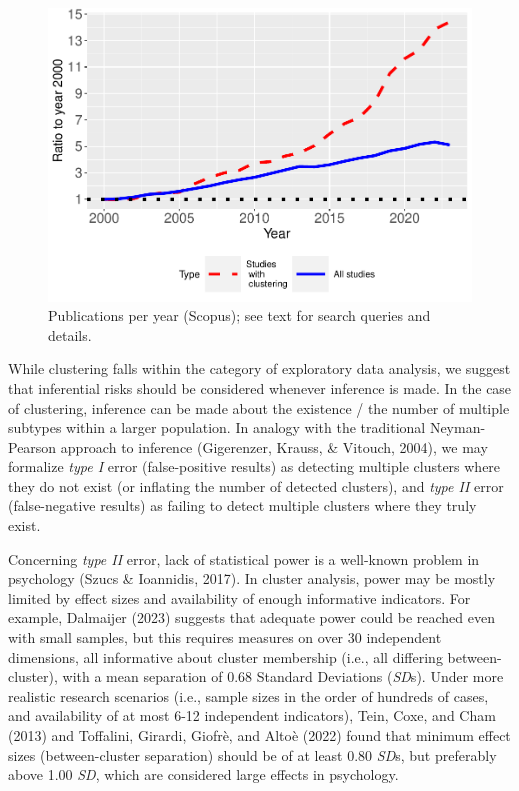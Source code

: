 \documentclass[
  man,floatsintext]{apa6}
\begin{document}
\begin{figure}

{\centering \includegraphics{paper_files/figure-latex/figure-literature-trends-1} 

}

\caption{Publications per year (Scopus); see text for search queries and details.}\label{fig:figure-literature-trends}
\end{figure}

While clustering falls within the category of exploratory data analysis, we suggest that inferential risks should be considered whenever inference is made. In the case of clustering, inference can be made about the existence / the number of multiple subtypes within a larger population. In analogy with the traditional Neyman-Pearson approach to inference (Gigerenzer, Krauss, \& Vitouch, 2004), we may formalize \emph{type I} error (false-positive results) as detecting multiple clusters where they do not exist (or inflating the number of detected clusters), and \emph{type II} error (false-negative results) as failing to detect multiple clusters where they truly exist.

Concerning \emph{type II} error, lack of statistical power is a well-known problem in psychology (Szucs \& Ioannidis, 2017). In cluster analysis, power may be mostly limited by effect sizes and availability of enough informative indicators. For example, Dalmaijer (2023) suggests that adequate power could be reached even with small samples, but this requires measures on over 30 independent dimensions, all informative about cluster membership (i.e., all differing between-cluster), with a mean separation of 0.68 Standard Deviations (\emph{SD}s). Under more realistic research scenarios (i.e., sample sizes in the order of hundreds of cases, and availability of at most 6-12 independent indicators), Tein, Coxe, and Cham (2013) and Toffalini, Girardi, Giofrè, and Altoè (2022) found that minimum effect sizes (between-cluster separation) should be of at least 0.80 \emph{SD}s, but preferably above 1.00 \emph{SD}, which are considered large effects in psychology.
\end{document}
